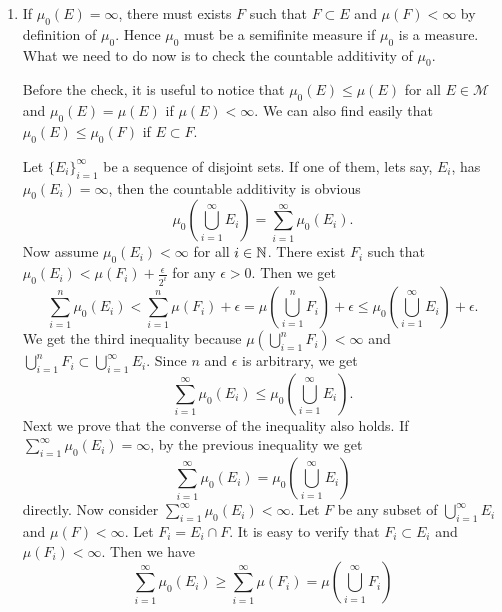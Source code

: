 \begin{sol}
  \begin{enumerate}
    \item If $\mu_0\left( E \right) =\infty$, there must exists $F$ such that $F\subset E$ and $\mu\left( F \right) <\infty$ by definition of  $\mu_0$. Hence $\mu_0$ must be a semifinite measure if $\mu_0$ is a measure. What we need to do now is to check the countable additivity of $\mu_0$.
     
      Before the check, it is useful to notice that $\mu_0\left( E \right)\le \mu\left( E \right)  $ for all $E\in \mathcal{M}$ and  $\mu_0\left( E \right) =\mu\left( E \right) $ if $\mu\left( E \right) <\infty$. We can also find easily that $\mu_0\left( E \right) \le \mu_0\left( F \right) $ if $E\subset F$. 
      
      Let $\{E_i\} _{i=1}^{\infty}$ be a sequence of disjoint sets. If one of them, lets say, $E_i$, has  $\mu_0\left( E_i \right)=\infty $, then the countable additivity is obvious 
       \[
	 \mu_{0}\left( \bigcup_{i=1} ^{\infty}E_i \right) =\sum_{i=1}^{\infty}\mu_{0}\left( E_i \right) 
      .\]
      Now assume $\mu_0\left( E_i \right) <\infty$ for all  $i\in \mathbb{N}$.  
      There exist $F_i$ such that $\mu_0\left( E_i \right)<\mu\left( F_i \right) +\frac{\epsilon}{2^i} $ for any $\epsilon >0$. Then we get
      \[
	\sum_{i=1}^{n}\mu_0\left( E_i \right) < \sum_{i=1}^{n}\mu\left( F_i \right)+\epsilon =  \mu\left( \bigcup_{i=1} ^{n}F_i \right) +\epsilon \leq \mu_0\left( \bigcup_{i=1} ^{\infty}E_i \right) +\epsilon  
      .\]
      We get the third inequality because $\mu\left( \bigcup_{i=1} ^{n}F_i \right) <\infty$ and $\bigcup_{i=1} ^{n}F_i\subset \bigcup_{i=1} ^{\infty}E_i$.
      Since $n$ and $\epsilon $ is arbitrary, we get 
      \[
	\sum_{i=1}^{\infty}\mu_{0}\left( E_i \right) \le \mu_0\left( \bigcup_{i=1}^{\infty}E_i \right) 
      .\]
      Next we prove that the converse of the inequality also holds. If $\sum_{i=1}^{\infty}\mu_0\left( E_i \right) =\infty$, by the previous inequality we get 
\[
	\sum_{i=1}^{\infty}\mu_{0}\left( E_i \right) = \mu_0\left( \bigcup_{i=1}^{\infty}E_i \right) 
\] 
      directly. Now consider $\sum_{i=1}^{\infty}\mu_0\left( E_i \right) <\infty$. Let $F$ be any subset of  $\bigcup_{i=1} ^{\infty}E_i$ and $\mu\left( F \right) <\infty$. Let $F_i=E_i\cap F$. It is easy to verify that $F_i\subset E_i$ and $\mu\left( F_i \right) <\infty$.
      Then we have
      \[
      \sum_{i=1}^{\infty}\mu_0\left( E_i \right) \ge \sum_{i=1}^{\infty}\mu\left( F_i \right) =\mu\left( \bigcup_{i=1} ^{\infty}F_i \right) 
\]
\end{enumerate}
\end{sol}
